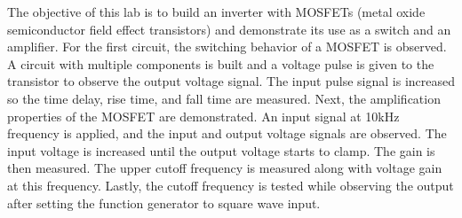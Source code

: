 The objective of this lab is to build an inverter with MOSFETs (metal oxide semiconductor field effect transistors) and demonstrate its use as a switch and an amplifier. For the first circuit, the switching behavior of a MOSFET is observed. A circuit with multiple components is built and a voltage pulse is given to the transistor to observe the output voltage signal. The input pulse signal is increased so the time delay, rise time, and fall time are measured. Next, the amplification properties of the MOSFET are demonstrated. An input signal at 10kHz frequency is applied, and the input and output voltage signals are observed. The input voltage is increased until the output voltage starts to clamp. The gain is then measured. The upper cutoff frequency is measured along with voltage gain at this frequency. Lastly, the cutoff frequency is tested while observing the output after setting the function generator to square wave input. \\
